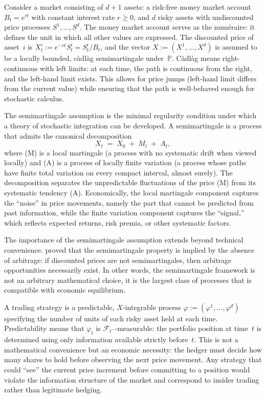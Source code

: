 Consider a market consisting of $d+1$ assets: a risk-free money market
account $B_t = e^{rt}$ with constant interest rate $r \ge 0$, and $d$
risky assets with undiscounted price processes $S^1, \ldots, S^d$.  The
money market account serves as the num\'eraire: it defines the unit in
which all other values are expressed.  The discounted price of asset~$i$
is $X^i_t := e^{-rt} S^i_t = S^i_t / B_t$, and the vector
$X := (X^1, \ldots, X^d)$ is assumed to be a locally bounded,
c\`{a}dl\`{a}g semimartingale under~$\mathbb{P}$.  C\`{a}dl\`{a}g means
right-continuous with left limits: at each time, the path is continuous
from the right, and the left-hand limit exists.  This allows for price
jumps (left-hand limit differs from the current value) while ensuring
that the path is well-behaved enough for stochastic calculus.

The semimartingale assumption is the minimal regularity condition under
which a theory of stochastic integration can be developed.  A
semimartingale is a process that admits the canonical decomposition
\begin{equation}
\label{eq:semimartingale_decomp}
X_t \;=\; X_0 \;+\; M_t \;+\; A_t,
\end{equation}
where (M) is a local martingale (a process with no systematic drift when viewed locally) and (A) is a process of locally finite variation (a process whose paths have finite total variation on every compact interval, almost surely). The decomposition separates the unpredictable fluctuations of the price (M) from its systematic tendency (A). Economically, the local martingale component captures the “noise” in price movements, namely the part that cannot be predicted from past information, while the finite variation component captures the “signal,” which reflects expected returns, risk premia, or other systematic factors.


The importance of the semimartingale assumption extends beyond technical
convenience.  \citet{DelbaenSchachermayer1994} proved that the
semimartingale property is implied by the absence of arbitrage: if
discounted prices are not semimartingales, then arbitrage opportunities
necessarily exist.  In other words, the semimartingale framework is not an
arbitrary mathematical choice, it is the largest class of processes
that is compatible with economic equilibrium.

A trading strategy is a predictable, $X$-integrable process
$\varphi := (\varphi^1, \ldots, \varphi^d)$ specifying the number of
units of each risky asset held at each time.  Predictability means that
$\varphi_t$ is $\mathcal{F}_{t^-}$-measurable: the portfolio position at
time~$t$ is determined using only information available strictly
before~$t$.  This is not a mathematical convenience but an economic
necessity: the hedger must decide how many shares to hold before
observing the next price movement.  Any strategy that could ``see'' the
current price increment before committing to a position would violate the
information structure of the market and correspond to insider trading
rather than legitimate hedging.

